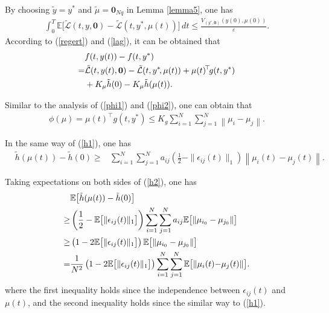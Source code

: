 \documentclass[final,5p,times,twocolumn,authoryear]{elsarticle}
\begin{document}
	
	By choosing $\tilde{y}=y^*$ and $\tilde{\mu}=\boldsymbol{0}_{Nq}$ in Lemma \ref{lemma5}, one has
	\begin{align}
		\int_{0}^{T} \mathbb{E}\big[ \mathcal{\tilde{L}}(t,y,\boldsymbol{0}) - \mathcal{\tilde{L}}(t,y^*,\mu(t)) \big] \,dt
		\le
		\frac{V_{(y^*, \boldsymbol{0})}(y(0), \mu(0))
		}{\varepsilon}.\label{th4a}
	\end{align}
	According to (\ref{regert}) and (\ref{lag}), it can be obtained that
	\begin{align}
		&f(t,y(t))-f(t,y^*)\notag\\
		=&\mathcal{\tilde{L}}(t,y(t),\boldsymbol{0}) - \mathcal{\tilde{L}}(t,y^*\!,\mu(t)) + \mu(t)^{\!\top} \!g(t,y^*) \notag\\
		&+K_\mu\tilde{h}(0)-K_\mu\tilde{h}(\mu(t)).	\label{v46}
	\end{align}
	
	Similar to the analysis of (\ref{phi1}) and (\ref{phi2}), one can obtain that
	\begin{align}
		\phi(\mu)
		=\mu(t)^\top g(t,y^*)
		\le K_g \sum_{i=1}^{N} \sum_{j=1}^{N} \left\|\mu_i-\mu_j\right\|.\label{phi3}
	\end{align}
	
	In the same way of (\ref{h1}), one has
	\begin{align}
		&\tilde{h}(\mu(t))- \tilde{h}(0)
		\ge
		&\sum_{i=1}^N\sum_{j=1}^Na_{ij} \left(\frac{1}{2}-\|\epsilon_{ij}(t)\|_1\right) \left\|\mu_i(t)-\mu_j(t)\right\|.\label{h2}
	\end{align}
	
	Taking expectations on both sides of (\ref{h2}), one has
	\begin{align}
		&\mathbb{E}\big[\tilde{h}(\mu(t))- \tilde{h}(0)\big]\notag\\
		\ge
		&\left(\frac{1}{2}- \mathbb{E}\big[\|\epsilon_{ij}(t)\|_1\big] \right) \sum_{i=1}^N\sum_{j=1}^Na_{ij} \mathbb{E}\big[\|\mu_{i_0}-\mu_{j_0}\|\big] \notag\\
		\ge
		&\left(1- 2\mathbb{E}\big[\|\epsilon_{ij}(t)\|_1\big] \right) \mathbb{E}\big[\|\mu_{i_0}-\mu_{j_0}\|\big]\notag\\
		=
		&\frac{1}{N^2}\left(1- 2\mathbb{E}\big[\|\epsilon_{ij}(t)\|_1\big] \right) \sum_{i=1}^N\sum_{j=1}^N \mathbb{E}\big[\|\mu_i(t){-}\mu_j(t)\|\big]. \label{h3}
	\end{align}
	where the first inequality holds since the independence between $\epsilon_{ij}(t)$ and $\mu(t)$, and the second inequality holds since the similar way to (\ref{h1}).
	
\end{document}
